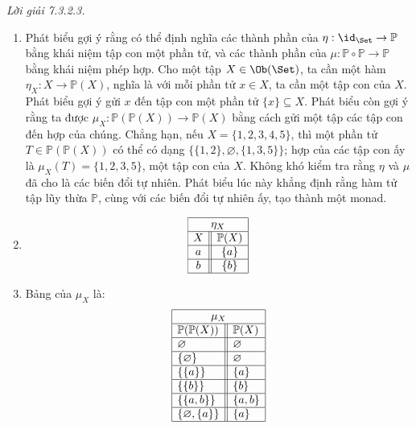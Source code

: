 \noindent\textit{Lời giải 7.3.2.3.}\keepwithnext
\begin{enumerate}[label=\alph*.]
\item Phát biểu gợi ý rằng có thể định nghĩa các thành phần của $\eta:\id_{\Set}\to\mathbb P$ bằng khái niệm tập con một phần tử, và các thành phần của $\mu:\mathbb P\circ\mathbb P\to\mathbb P$ bằng khái niệm phép hợp. Cho một tập $X\in\Ob(\Set)$, ta cần một hàm $\eta_X:X\to\mathbb P(X)$, nghĩa là với mỗi phần tử $x\in X$, ta cần một tập con của $X$. Phát biểu gợi ý gửi $x$ đến tập con một phần tử $\{x\}\subseteq X$. Phát biểu còn gợi ý rằng ta được $\mu_X:\mathbb P(\mathbb P(X))\to\mathbb P(X)$ bằng cách gửi một tập các tập con đến hợp của chúng. Chẳng hạn, nếu $X=\{1,2,3,4,5\}$, thì một phần tử $T\in\mathbb P(\mathbb P(X))$ có thể có dạng $\{\{1,2\},\varnothing,\{1,3,5\}\}$; hợp của các tập con ấy là $\mu_X(T)=\{1,2,3,5\}$, một tập con của $X$. Không khó kiểm tra rằng $\eta$ và $\mu$ đã cho là các biến đổi tự nhiên. Phát biểu lúc này khẳng định rằng hàm tử tập lũy thừa $\mathbb P$, cùng với các biến đổi tự nhiên ấy, tạo thành một monad.
\item
\[
\begin{array}{|c||c|}\hline\multicolumn{2}{|c|}{\eta_X}\\\hline X&\mathbb P(X)\\\hline a&\{a\}\\\hline b&\{b\}\\\hline\end{array}
\]
\item Bảng của $\mu_X$ là:
\[
\begin{array}{|l||l|}\hline\multicolumn{2}{|c|}{\mu_X}\\\hline\mathbb P(\mathbb P(X))&\mathbb P(X)\\\hline
\varnothing&\varnothing\\\hline
\{\varnothing\}&\varnothing\\\hline
\{\{a\}\}&\{a\}\\\hline
\{\{b\}\}&\{b\}\\\hline
\{\{a,b\}\}&\{a,b\}\\\hline
\{\varnothing,\{a\}\}&\{a\}\\\hline

\end{array}\]
\end{enumerate}
